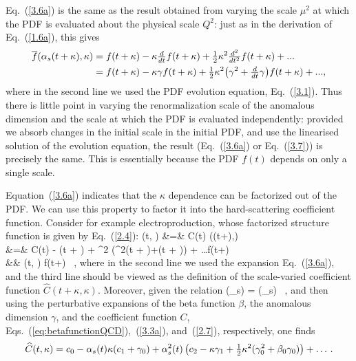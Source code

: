 Eq.~(\ref{3.6a}) is the same as the result obtained from 
varying the scale $\mu^2$ at which the PDF is evaluated about the 
physical scale $Q^2$: just as
in the derivation of Eq.~(\ref{1.6a}), this gives
%
\begin{equation} \label{3.7}
\begin{split}
	\overline{f}(\alpha_s(t + \kappa), \kappa) & = f(t + \kappa) - \kappa\hbox{${{d}\over {dt}}$} {f}(t + \kappa) + \hbox{${{1}\over {2}}$} \kappa^2  \hbox{${{d^2}\over {dt^2}}$}{f}(t + \kappa) + ... \\
	& = f(t + \kappa) - \kappa \gamma f(t + \kappa) + \hbox{${{1}\over {2}}$} \kappa^2  \big(\gamma^2 + \hbox{${{d}\over {dt}}$}\gamma\big) f(t + \kappa) + ..., 
\end{split}
\end{equation}
%
where in the second line we used the PDF evolution equation,
Eq.~(\ref{3.1}).
%
Thus there is little point in varying the renormalization scale of the anomalous dimension and the scale at which the PDF is evaluated independently: provided we absorb changes in the initial scale in the initial PDF, and use the linearised solution of the evolution equation, the result (Eq.~(\ref{3.6a}) or Eq.~(\ref{3.7})) is precisely the same.
%
This is essentially because the PDF $f(t)$ depends on only a single scale. 

Equation~(\ref{3.6a}) indicates that the $\kappa$ dependence can be factorized
out of the PDF.
%
We can use this property to factor it into the hard-scattering
coefficient
function.
%
Consider for example electroproduction, whose factorized
structure function is given by Eq.~(\ref{2.4}):
%
\bea\label{3.7a}
    (t, \kappa) &=& {C}(t) (\as(t+\kappa),\kappa)\nonumber\\
    &=& {C}(t)  - \kappa \gamma(t + \kappa) + \half \kappa^2  (\gamma^2(t + \kappa)+(t + \kappa)) + \ldots \rc f(t+\kappa)\nonumber\\
    &\equiv& (t, \kappa) f(t+\kappa) \, ,
\eea
%
where in the second line we used the expansion Eq.~(\ref{3.6a}),
and the third line
should be viewed as the  definition of
the scale-varied coefficient function $\widehat{C}(t+\kappa, \kappa)$.
%
Moreover, given the relation
\be
{}\gamma(\alpha_s) = \beta(\alpha_s)  \, ,
\ee
and then using the perturbative expansions of
the beta function $\beta$, the anomalous dimension $\gamma$, and the coefficient function
$C$, Eqs.~(\ref{eq:betafunctionQCD}),~(\ref{3.3a}), and~(\ref{2.7}),
respectively, one finds
\begin{equation}
  \label{3.7c}
	\widehat{C}(t, \kappa) 
	 = c_0 - \alpha_s(t) \kappa (c_1+\gamma_0) + \alpha_s^2(t)  \left( c_2- \kappa \gamma_1 + \hbox{${{1}\over {2}}$} \kappa^2  (\gamma_0^2 + \beta_0 \gamma_0)\right) + \ldots \, .
\end{equation}

